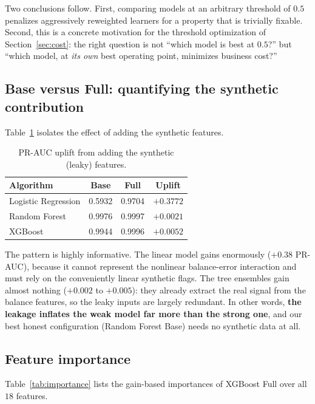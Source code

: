 \documentclass{article}
\begin{document}
Two conclusions follow. First, comparing models at an arbitrary
threshold of $0.5$ penalizes aggressively reweighted learners for a
property that is trivially fixable. Second, this is a concrete
motivation for the threshold optimization of Section~\ref{sec:cost}:
the right question is not ``which model is best at $0.5$?'' but ``which
model, at \emph{its own} best operating point, minimizes business
cost?''

\subsection{Base versus Full: quantifying the synthetic contribution}
Table~\ref{tab:uplift} isolates the effect of adding the synthetic
features.

\begin{table}[H]
\centering
\caption{PR-AUC uplift from adding the synthetic (leaky) features.}
\label{tab:uplift}
\begin{tabular}{lccc}
\toprule
Algorithm & Base & Full & Uplift \\
\midrule
Logistic Regression & 0.5932 & 0.9704 & $+0.3772$ \\
Random Forest       & 0.9976 & 0.9997 & $+0.0021$ \\
XGBoost             & 0.9944 & 0.9996 & $+0.0052$ \\
\bottomrule
\end{tabular}
\end{table}

The pattern is highly informative. The linear model gains enormously
($+0.38$ PR-AUC), because it cannot represent the nonlinear
balance-error interaction and must rely on the conveniently linear
synthetic flags. The tree ensembles gain almost nothing
($+0.002$ to $+0.005$): they already extract the real signal from the
balance features, so the leaky inputs are largely redundant. In other
words, \textbf{the leakage inflates the weak model far more than the
strong one}, and our best honest configuration (Random Forest Base)
needs no synthetic data at all.

\subsection{Feature importance}
\label{subsec:importance}
Table~\ref{tab:importance} lists the gain-based importances of XGBoost
Full over all $18$ features.
\end{document}
